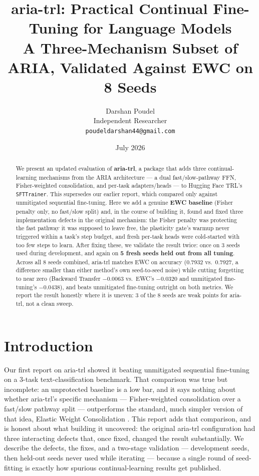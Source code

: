 \documentclass[10pt,twocolumn]{article}
\title{\textbf{aria-trl}: Practical Continual Fine-Tuning for Language Models\\
\large A Three-Mechanism Subset of ARIA, Validated Against EWC on 8 Seeds}
\author{
  Darshan Poudel\\
  Independent Researcher\\
  \texttt{poudeldarshan44@gmail.com}
}
\date{July 2026}
\begin{document}
\maketitle

\begin{abstract}

We present an updated evaluation of \textbf{aria-trl}, a package that adds
three continual-learning mechanisms from the ARIA architecture
\citep{poudel2026aria} — a dual fast/slow-pathway FFN, Fisher-weighted
consolidation, and per-task adapters/heads — to Hugging Face TRL's
\texttt{SFTTrainer}. This supersedes our earlier report, which compared only
against unmitigated sequential fine-tuning. Here we add a genuine
\textbf{EWC baseline} (Fisher penalty only, no fast/slow split) and, in the
course of building it, found and fixed three implementation defects in the
original mechanism: the Fisher penalty was protecting the fast pathway it was
supposed to leave free, the plasticity gate's warmup never triggered within a
task's step budget, and fresh per-task heads were cold-started with too few
steps to learn. After fixing these, we validate the result twice: once on 3
seeds used during development, and again on \textbf{5 fresh seeds held out
from all tuning}. Across all 8 seeds combined, aria-trl matches EWC on
accuracy (0.7932 vs.\ 0.7927, a difference smaller than either method's own
seed-to-seed noise) while cutting forgetting to near zero
(Backward Transfer $-0.0063$ vs.\ EWC's $-0.0320$ and unmitigated
fine-tuning's $-0.0438$), and beats unmitigated fine-tuning outright on both
metrics. We report the result honestly where it is uneven: 3 of the 8 seeds
are weak points for aria-trl, not a clean sweep.

\end{abstract}

\section{Introduction}
\label{sec:intro}

Our first report on aria-trl \citep{poudel2026trlv1} showed it beating
unmitigated sequential fine-tuning on a 3-task text-classification benchmark.
That comparison was true but incomplete: an unprotected baseline is a low bar,
and it says nothing about whether aria-trl's specific mechanism —
Fisher-weighted consolidation over a fast/slow pathway split — outperforms
the standard, much simpler version of that idea, Elastic Weight Consolidation
\citep{kirkpatrick2017overcoming}. This report adds that comparison, and is
honest about what building it uncovered: the original aria-trl configuration
had three interacting defects that, once fixed, changed the result
substantially. We describe the defects, the fixes, and a two-stage validation
— development seeds, then held-out seeds never used while iterating — because
a single round of seed-fitting is exactly how spurious continual-learning
results get published.
\end{document}
